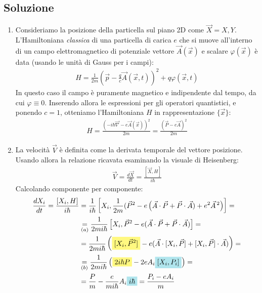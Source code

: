 \documentclass[../../FisicaTeorica.tex]{subfiles}
\begin{document}
\subsection{Soluzione}
\begin{enumerate}
\item Consideriamo la posizione della particella sul piano 2D come $\vec{X}={X,Y}$.\\
L'Hamiltoniana \textit{classica} di una particella di carica $e$ che si muove all'interno di un campo elettromagnetico di potenziale vettore $\vec{A}(\vec{x})$ e scalare $\varphi(\vec{x})$ è data (usando le unità di Gauss per i campi):
\begin{align*}
H = \frac{1}{2m}\left(\vec{p}-\frac{q}{c}\vec{A}(\vec{x},t)\right)^2 + q\varphi(\vec{x},t)
\end{align*}
In questo caso il campo è puramente magnetico e indipendente dal tempo, da cui $\varphi \equiv 0$. Inserendo allora le espressioni per gli operatori quantistici, e ponendo $c=1$, otteniamo l'Hamiltoniana $H$ in rappresentazione $\{\vec{x}\}$:
\begin{align}
H=\frac{(-i\hbar \vec{\nabla} - e\vec{A}(\vec{x}))^2}{2m}=\frac{(\vec{P}-e\vec{A})^2}{2m}
\label{eqn:magnetic-hamiltonian}
\end{align}
\item La velocità $\vec{V}$ è definita come la derivata temporale del vettore posizione. Usando allora la relazione ricavata esaminando la visuale di Heisenberg:
\begin{align*}
\vec{V} = \frac{d\vec{X}}{dt} = \frac{[\vec{X},H]}{i\hbar}
\end{align*}
Calcolando componente per componente:
\begin{align}\nonumber
\frac{dX_i}{dt} = \frac{[X_i, H]}{i\hbar}&=\frac{1}{i\hbar}\left[X_i, \frac{1}{2m}(\vec{P}^{2} - e\left(\vec{A}\cdot \vec{P} + \vec{P}\cdot \vec{A}) + e^2\vec{A}^{\,2}\right)\right]=\\\nonumber
&\underset{(a)}{=}\frac{1}{2mi\hbar}\left[X_i, \vec{P}^2 -e(\vec{A}\cdot \vec{P}+\vec{P}\cdot \vec{A}) \right]=\\\nonumber
&= \frac{1}{2mi\hbar} \left({\hlc{Yellow}{[X_i, \vec{P}^2]} }- e(\vec{A}\cdot[X_i,\vec{P}] + [X_i, \vec{P}]\cdot \vec{A} ) \right) =\\\nonumber
&\underset{(b)}{=} \frac{1}{2mi\hbar}\left(\hlc{Yellow}{2i\hbar P} -2e A_i\hlc{SkyBlue}{[X_i,P_i]} \right)=\\
&= \frac{P}{m} -\frac{e}{mi\hbar}A_i \hlc{SkyBlue}{i\hbar} =\frac{P_i - eA_i}{m} \label{eqn:derivate-posizione}

\end{align}
\end{enumerate}
\end{document}
